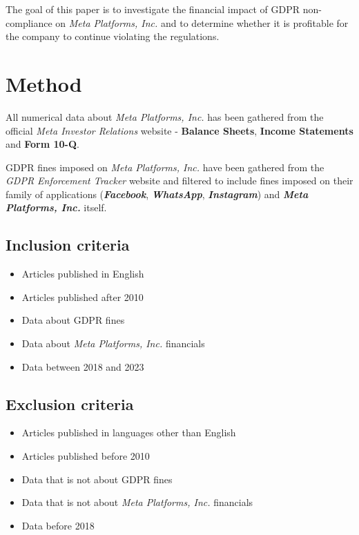 \documentclass[12pt, a4paper]{article}
\begin{document}
The goal of this paper is to investigate the financial impact of GDPR
non-compliance on \textit{Meta Platforms, Inc.} and to determine whether it is
profitable for the company to continue violating the regulations.

\section*{Method}

All numerical data about \textit{Meta Platforms, Inc.} has been gathered from
the official \textit{Meta Investor Relations} website\cite{fbMetaFinancials} -
\textbf{Balance Sheets}, \textbf{Income Statements} and \textbf{Form 10-Q}.

GDPR fines imposed on \textit{Meta Platforms, Inc.} have been gathered from the
\textit{GDPR Enforcement Tracker}
website\cite{enforcementtrackerGDPREnforcement} and filtered to include fines
imposed on their family of applications (\textbf{\textit{Facebook}},
\textbf{\textit{WhatsApp}}, \textbf{\textit{Instagram}}) and
\textbf{\textit{Meta Platforms, Inc.}} itself.

\subsection*{Inclusion criteria}

\begin{itemize}
    \item Articles published in English
    \item Articles published after 2010
    \item Data about GDPR fines
    \item Data about \textit{Meta Platforms, Inc.} financials
    \item Data between 2018 and 2023
\end{itemize}

\subsection*{Exclusion criteria}

\begin{itemize}
    \item Articles published in languages other than English
    \item Articles published before 2010
    \item Data that is not about GDPR fines
    \item Data that is not about \textit{Meta Platforms, Inc.} financials
    \item Data before 2018
\end{itemize}
\end{document}
